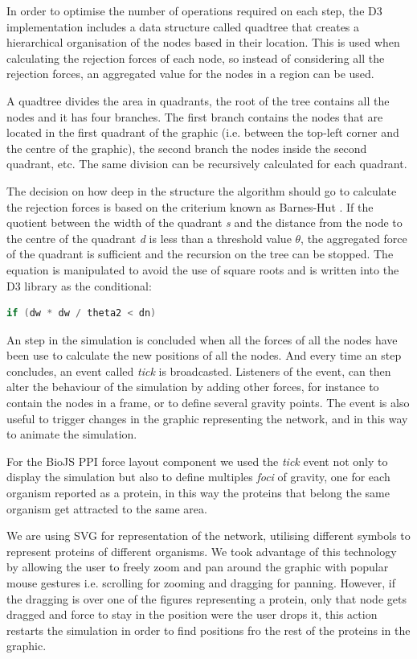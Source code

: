 In order to optimise the number of operations required on each step, the D3 implementation includes a data structure called quadtree that creates a hierarchical organisation of the nodes based in their location. This is used when calculating the rejection forces of each node, so instead of considering all the rejection forces, an aggregated value for the nodes in a region can be used.

A quadtree divides the area in quadrants, the root of the tree contains all the nodes and it has four branches. The first branch contains the nodes that are located in the first quadrant of the graphic (i.e. between the top-left corner and the centre of the graphic), the second branch the nodes inside the second quadrant, etc. The same division can be recursively calculated for each quadrant.

The decision on how deep in the structure the algorithm should go to calculate the rejection forces is based on the criterium known as Barnes-Hut \cite{BAR1986}. If the quotient between the width of the quadrant \emph{s} and the distance from the node to the centre of the quadrant \emph{d} is less than a threshold value $\theta$, the aggregated force of the quadrant is sufficient and the recursion on the tree can be stopped. The equation is manipulated to avoid the use of square roots and is written into the D3 library as the conditional:

\begin{lstlisting}[language=java]
if (dw * dw / theta2 < dn) 
\end{lstlisting}

An step in the simulation is concluded when all the forces of all the nodes have been use to calculate the new positions of all the nodes. And every time an step concludes, an event called \emph{tick} is broadcasted. Listeners of the event, can then alter the behaviour of the simulation by adding other forces, for instance to contain the nodes in a frame, or to define several gravity points. The event is also useful to trigger changes in the graphic representing the network, and in this way to animate the simulation.

For the BioJS PPI force layout component we used the \emph{tick} event not only to display the simulation but also to  define multiples \emph{foci} of gravity, one for each organism reported as a protein, in this way the proteins that belong the same organism get attracted to the same area.

We are using SVG for representation of the network, utilising different symbols to represent proteins of different organisms. We took advantage of this technology by allowing the user to freely zoom and pan around the graphic with popular mouse gestures i.e. scrolling for zooming and dragging for panning. However, if the dragging is over one of the figures representing a protein, only that node gets dragged and force to stay in the position were the user drops it, this action restarts the simulation in  order to find positions fro the rest of the proteins in the graphic.

